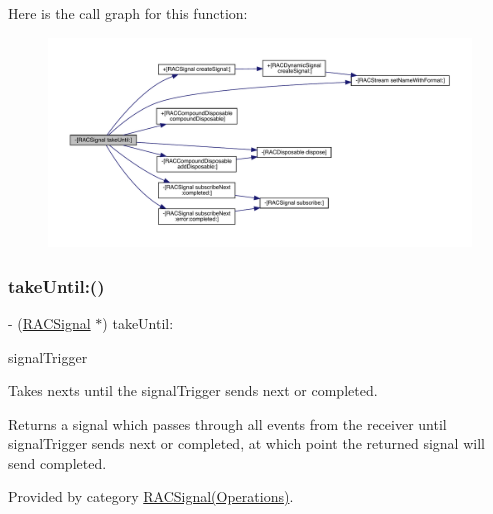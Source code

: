 Here is the call graph for this function\+:\nopagebreak
\begin{figure}[H]
\begin{center}
\leavevmode
\includegraphics[width=350pt]{interface_r_a_c_signal_afb214e9e69dc34880b306c118b8e56d4_cgraph}
\end{center}
\end{figure}
\mbox{\label{interface_r_a_c_signal_afb214e9e69dc34880b306c118b8e56d4}} 
\subsubsection{\texorpdfstring{take\+Until\+:()}{takeUntil:()}\hspace{0.1cm}{\footnotesize\ttfamily [3/3]}}
{\footnotesize\ttfamily -\/ (\mbox{\hyperlink{interface_r_a_c_signal}{R\+A\+C\+Signal}} $\ast$) take\+Until\+: \begin{DoxyParamCaption}\item[{(\mbox{\hyperlink{interface_r_a_c_signal}{R\+A\+C\+Signal}} $\ast$)}]{signal\+Trigger }\end{DoxyParamCaption}}

Takes {\ttfamily next}s until the {\ttfamily signal\+Trigger} sends {\ttfamily next} or {\ttfamily completed}.

Returns a signal which passes through all events from the receiver until {\ttfamily signal\+Trigger} sends {\ttfamily next} or {\ttfamily completed}, at which point the returned signal will send {\ttfamily completed}. 

Provided by category \mbox{\hyperlink{category_r_a_c_signal_07_operations_08_afb214e9e69dc34880b306c118b8e56d4}{R\+A\+C\+Signal(\+Operations)}}.

\mbox{\label{interface_r_a_c_signal_aa8536c9726338e10176997936be011ed}} 
